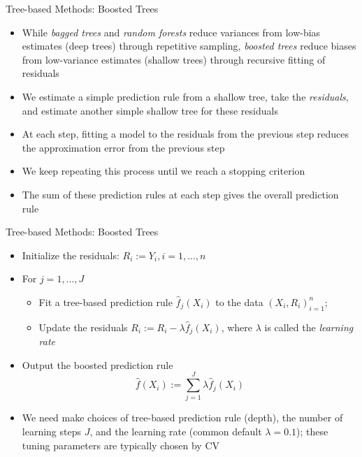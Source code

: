 \documentclass[aspectratio=1610,12pt,xcolor=dvipsnames]{beamer}
\begin{document}
\begin{frame}{Tree-based Methods: Boosted Trees}

\begin{itemize}
    \item While \textit{bagged trees} and \textit{random forests} reduce variances from low-bias estimates (deep trees) through repetitive sampling, \textit{boosted trees} reduce biases from low-variance estimates (shallow trees) through recursive fitting of residuals
    \item We estimate a simple prediction rule from a shallow tree, take the \textit{residuals}, and estimate another simple shallow tree for these residuals
    \item At each step, fitting a model to the residuals from the previous step reduces the approximation error from the previous step
    \item We keep repeating this process until we reach a stopping criterion
    \item The sum of these prediction rules at each step gives the overall prediction rule
\end{itemize}
\end{frame}

\begin{frame}{Tree-based Methods: Boosted Trees}

\begin{itemize}
  \item Initialize the residuals: $R_i := Y_i, i = 1,...,n$
  \item For $j = 1,...,J$
    \begin{itemize}
      \item Fit a tree-based prediction rule $\hat{f}_j(X_i)$ to the data $(X_i, R_i)_{i=1}^n$;
      \item Update the residuals $R_i := R_i - \lambda \hat{f}_j(X_i)$, where 
            $\lambda$ is called the \textit{learning rate}
    \end{itemize}
  \item Output the boosted prediction rule
    \[
      \hat{f}(X_i) := \sum_{j=1}^J \lambda \hat{f}_j(X_i)
    \]
  \item We need make choices of tree-based prediction rule (depth), the number of learning steps $J$, and the learning rate (common default $\lambda=0.1$); these tuning parameters are typically chosen by CV
\end{itemize}
\end{frame}
\end{document}
